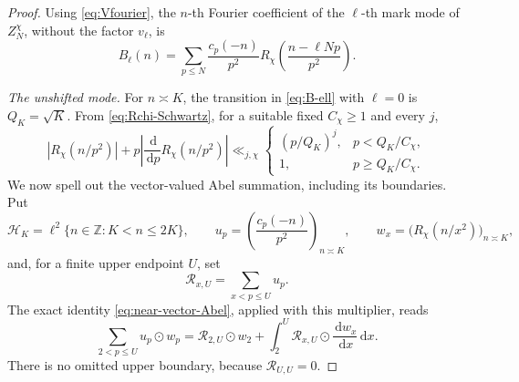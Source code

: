 \documentclass[11pt]{article}
\numberwithin{equation}{section}
\theoremstyle{definition}
\newcommand{\Z}{\mathbb Z}
\newcommand{\1}{\mathbf 1}
\newcommand{\dd}{\,\mathrm d}
\begin{document}
\begin{proof}
Using \eqref{eq:Vfourier}, the \(n\)-th Fourier coefficient of the
\(\ell\)-th mark mode of \(Z_N^\chi\), without the factor \(v_\ell\),
is
\begin{equation}\label{eq:B-ell}
 B_\ell(n)=
 \sum_{p\le N}\frac{c_p(-n)}{p^2}
 R_\chi\left(\frac{n-\ell Np}{p^2}\right).
\end{equation}

\smallskip
\noindent\emph{The unshifted mode.}
For \(n\asymp K\), the transition in \eqref{eq:B-ell} with
\(\ell=0\) is \(Q_K=\sqrt K\).  From
\eqref{eq:Rchi-Schwartz}, for a suitable fixed \(C_\chi\ge1\) and
every \(j\),
\[
 |R_\chi(n/p^2)|+
 p\left|\frac{\dd}{\dd p}R_\chi(n/p^2)\right|
 \ll_{j,\chi}
 \begin{cases}
 (p/Q_K)^j,&p<Q_K/C_\chi,\\
 1,&p\ge Q_K/C_\chi.
 \end{cases}
\]
We now spell out the vector-valued Abel summation, including its
boundaries.  Put
\[
 \mathcal H_K=\ell^2\{n\in\Z:K<n\le2K\},\qquad
 u_p=\left(\frac{c_p(-n)}{p^2}\right)_{n\asymp K},\qquad
 w_x=\bigl(R_\chi(n/x^2)\bigr)_{n\asymp K},
\]
and, for a finite upper endpoint \(U\), set
\[
 \mathcal R_{x,U}=\sum_{x<p\le U}u_p.
\]
The exact identity \eqref{eq:near-vector-Abel}, applied with this
multiplier, reads
\begin{equation}\label{eq:Rchi-vector-Abel}
 \sum_{2<p\le U}u_p\odot w_p
 =\mathcal R_{2,U}\odot w_2+
 \int_2^U\mathcal R_{x,U}\odot\frac{\dd w_x}{\dd x}\dd x.
\end{equation}
There is no omitted upper boundary, because
\(\mathcal R_{U,U}=0\).


\end{proof}
\end{document}
